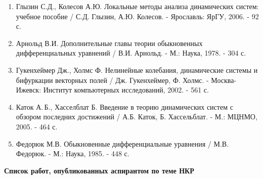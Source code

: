 \documentclass[12pt]{extarticle}
\begin{document}
\begin{enumerate}[leftmargin=1.5\parindent]
\item Глызин С.Д., Колесов А.Ю. Локальные методы анализа динамических систем: учебное пособие / С.Д. Глызин, А.Ю. Колесов. - Ярославль: ЯрГУ, 2006. - 92 с.

\item Арнольд В.И. Дополнительные главы теории обыкновенных дифференциальных уравнений / В.И. Арнольд. - М.: Наука, 1978. - 304 с. 

\item Гукенхеймер Дж., Холмс Ф. Нелинейные колебания, динамические системы и бифуркации векторных полей / Дж. Гукенхеймер, Ф. Холмс. - Москва-Ижевск: Институт компьютерных исследований, 2002. - 561 с.

\item Каток А.\,Б., Хасселблат Б. Введение в теорию динамических систем с обзором последних достижений / А.Б. Каток, Б. Хассельблат. - М.: МЦНМО, 2005. - 464 с.

\item Федорюк М.В. Обыкновенные дифференциальные уравнения / М.В. Федорюк. - М.: Наука, 1985. - 448 с.

\end{enumerate}

\newpage

\begin{center}
{\Large \textbf{Список работ, опубликованных аспирантом по теме НКР}}
\end{center}

\hspace{0cm}

\hspace{0cm}

\hspace{0cm}
\end{document}
